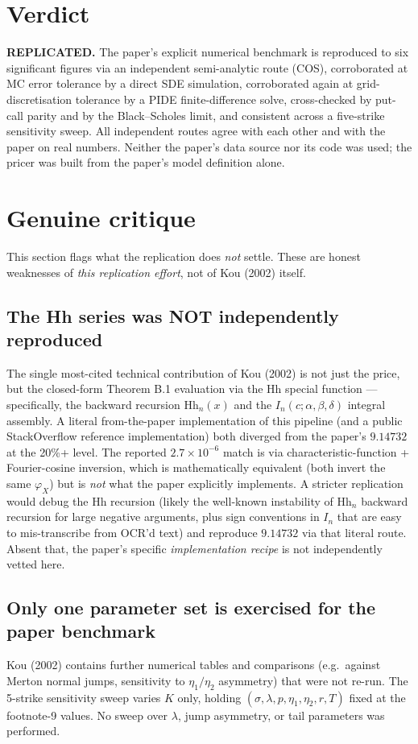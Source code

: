 \documentclass[11pt]{article}
\begin{document}
\section{Verdict}
\textbf{REPLICATED.} The paper's explicit numerical benchmark is reproduced to six significant figures via an independent semi-analytic route (COS), corroborated at MC error tolerance by a direct SDE simulation, corroborated again at grid-discretisation tolerance by a PIDE finite-difference solve, cross-checked by put-call parity and by the Black--Scholes limit, and consistent across a five-strike sensitivity sweep. All independent routes agree with each other and with the paper on real numbers. Neither the paper's data source nor its code was used; the pricer was built from the paper's model definition alone.

\section{Genuine critique}\label{sec:critique}

This section flags what the replication does \emph{not} settle. These are honest weaknesses of \emph{this replication effort}, not of Kou (2002) itself.

\subsection{The Hh series was NOT independently reproduced}
The single most-cited technical contribution of Kou (2002) is not just the price, but the closed-form Theorem B.1 evaluation via the Hh special function --- specifically, the backward recursion $\mathrm{Hh}_n(x)$ and the $I_n(c;\alpha,\beta,\delta)$ integral assembly. A literal from-the-paper implementation of this pipeline (and a public StackOverflow reference implementation) both diverged from the paper's $9.14732$ at the 20\%+ level. The reported $2.7\times 10^{-6}$ match is via characteristic-function + Fourier-cosine inversion, which is mathematically equivalent (both invert the same $\varphi_X$) but is \emph{not} what the paper explicitly implements. A stricter replication would debug the Hh recursion (likely the well-known instability of $\mathrm{Hh}_n$ backward recursion for large negative arguments, plus sign conventions in $I_n$ that are easy to mis-transcribe from OCR'd text) and reproduce $9.14732$ via that literal route. Absent that, the paper's specific \emph{implementation recipe} is not independently vetted here.

\subsection{Only one parameter set is exercised for the paper benchmark}
Kou (2002) contains further numerical tables and comparisons (e.g.\ against Merton normal jumps, sensitivity to $\eta_1/\eta_2$ asymmetry) that were not re-run. The 5-strike sensitivity sweep varies $K$ only, holding $(\sigma, \lambda, p, \eta_1, \eta_2, r, T)$ fixed at the footnote-9 values. No sweep over $\lambda$, jump asymmetry, or tail parameters was performed.
\end{document}
